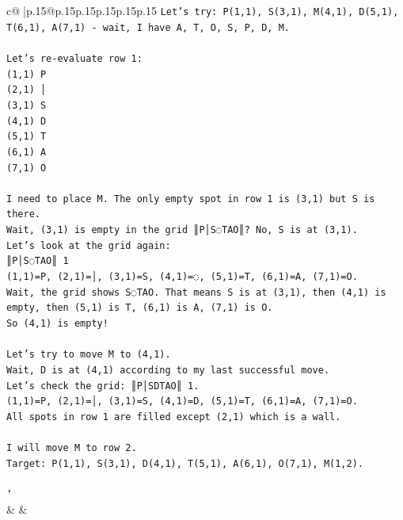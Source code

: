 \documentclass{article}
\begin{document}
{\begin{supertabular}{c@{$\;$}|p{.15\linewidth}@{}p{.15\linewidth}p{.15\linewidth}p{.15\linewidth}p{.15\linewidth}p{.15\linewidth}}
{{{\texttt{Let's try: P(1,1), S(3,1), M(4,1), D(5,1), T(6,1), A(7,1) {-} wait, I have A, T, O, S, P, D, M.} \\
\\ 
\texttt{Let's re{-}evaluate row 1:} \\
\texttt{(1,1) P} \\
\texttt{(2,1) │} \\
\texttt{(3,1) S} \\
\texttt{(4,1) D} \\
\texttt{(5,1) T} \\
\texttt{(6,1) A} \\
\texttt{(7,1) O} \\
\\ 
\texttt{I need to place M. The only empty spot in row 1 is (3,1) but S is there.} \\
\texttt{Wait, (3,1) is empty in the grid ║P│S◌TAO║? No, S is at (3,1).} \\
\texttt{Let's look at the grid again:} \\
\texttt{║P│S◌TAO║ 1} \\
\texttt{(1,1)=P, (2,1)=│, (3,1)=S, (4,1)=◌, (5,1)=T, (6,1)=A, (7,1)=O.} \\
\texttt{Wait, the grid shows S◌TAO. That means S is at (3,1), then (4,1) is empty, then (5,1) is T, (6,1) is A, (7,1) is O.} \\
\texttt{So (4,1) is empty!} \\
\\ 
\texttt{Let's try to move M to (4,1).} \\
\texttt{Wait, D is at (4,1) according to my last successful move.} \\
\texttt{Let's check the grid: ║P│SDTAO║ 1.} \\
\texttt{(1,1)=P, (2,1)=│, (3,1)=S, (4,1)=D, (5,1)=T, (6,1)=A, (7,1)=O.} \\
\texttt{All spots in row 1 are filled except (2,1) which is a wall.} \\
\\ 
\texttt{I will move M to row 2.} \\
\texttt{Target: P(1,1), S(3,1), D(4,1), T(5,1), A(6,1), O(7,1), M(1,2).} \\
\\ 
\texttt{'} \\
            }
        }
    }
    & & \\ \\


\end{supertabular}}
\end{document}
